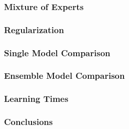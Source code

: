 \documentclass[xcolor={usenames,dvipsnames,svgnames}, compress]{beamer}
\begin{document}
\begin{frame}[t]
  \frametitle{Mixture of Experts}
  
\end{frame}

\begin{frame}[t]
  \frametitle{Regularization}
  
\end{frame}


\begin{frame}[t]
  \frametitle{Single Model Comparison}
  
\end{frame}

\begin{frame}[t]
  \frametitle{Ensemble Model Comparison}
  
\end{frame}

\begin{frame}[t]
  \frametitle{Learning Times}
  
\end{frame}

\begin{frame}[t]
  \frametitle{Conclusions}
  
\end{frame}







  
   
\end{document}
